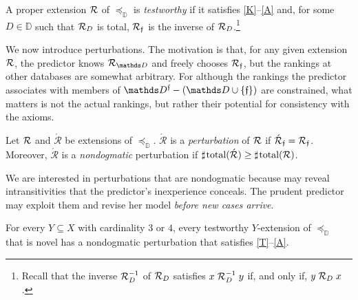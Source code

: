 \documentclass[12pt,a4paper,twoside]{article}
\newcommand{\novel}{\mathfrak f}
\newcommand{\preceqb}{\mathbin{\preceq}}
\newcommand{\countof}{\mathbin{\sharp}\hskip1pt}
\newcommand{\ext}{\mathrel{\mc R}}
\newcommand{\extb}{\mathbin{\mc R}}
\newcommand{\hextb}{\mathbin{\hat{\mathbin{\mathcal R}}}}
\newcommand{\aext}{\mathrel{\acute{\mathrel{\mathcal R}}}}
\newcommand{\aextb}{\mathbin{\acute{\mathbin{\mathcal R}}}}
\newcommand{\total}{\textup{total}}
\newcommand{\mbbd}{{\mathds D}}
\newcommand{\mbbdp}{{\mathds D^{\novel}}}
\begin{document}
\begin{definition*}\label{def-testworthy}

  A proper extension $ \ext $ of $\preceqb_{\mbbd}$ is \emph{testworthy} if it satisfies
  \textup{\ref{K}--\ref{A}} and, for some $D\in \mbbd$ such that $\ext_{D}$
  is total, $ \extb _{ \novel }$ is the inverse of $\extb_{D}$.\footnote{Recall
    that the inverse $ \ext _{ D } ^{ - 1 }$ of $ \ext _{ D }$ satisfies
    $ x \ext _{ D } ^{ - 1 } y $ if, and only if, $ y \ext _{ D } x$.}
\end{definition*}
We now introduce perturbations. The motivation is that, for any
given extension $\ext$, the predictor knows $\ext_{\mbbd}$ and freely chooses
$\ext_{\novel}$, but the rankings at other databases are somewhat arbitrary. For
although the rankings the predictor associates with members of
$\mbbdp\bs (\mbbd \cup \{\novel\}) $ are constrained, what
matters is not the actual rankings, but rather their potential for consistency
with the axioms.
\begin{definition*}
  Let $\ext$ and $\aext$ be extensions of $\preceqb_{\mbbd}$. $\aext$ is a
  \emph{perturbation} of $\ext$ if $\aextb_{\novel } =
  \extb_{\novel}$. Moreover, $\aext$ is a \emph{nondogmatic} perturbation if
  $\countof \total (\aextb) \geq \countof \total ( \extb)$.
\end{definition*}
We are interested in perturbations that are nondogmatic because may reveal
intransitivities that the predictor's inexperience conceals.
The prudent predictor may exploit them and revise her model \emph{before new cases arrive}.
\begin{prudence*}\label{P}

  For every $Y\subseteq X$ with cardinality $ 3$ or $ 4 $, every testworthy
  $ Y $-extension of $ \preceqb _{ \mbbd }$ that is novel has a
  nondogmatic perturbation that satisfies  \ref{T}–\ref{A}.
\end{prudence*}
\end{document}
